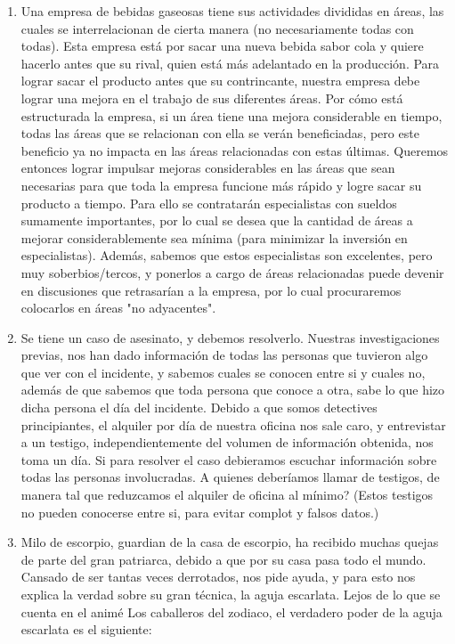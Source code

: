 \documentclass[a4paper]{article}
\begin{document}
\begin{enumerate}
	\item Una empresa de bebidas gaseosas tiene sus actividades divididas en áreas, las cuales se interrelacionan de cierta manera (no necesariamente todas con todas).  Esta empresa está por sacar una nueva bebida sabor cola y quiere hacerlo antes que su rival, quien está más adelantado en la producción.  Para lograr sacar el producto antes que su contrincante, nuestra empresa debe lograr una mejora en el trabajo de sus diferentes áreas.  Por cómo está estructurada la empresa, si un área tiene una mejora considerable en tiempo, todas las áreas que se relacionan con ella se verán beneficiadas, pero este beneficio ya no impacta en las áreas relacionadas con estas últimas.  Queremos entonces lograr impulsar mejoras considerables en las áreas que sean necesarias para que toda la empresa funcione más rápido y logre sacar su producto a tiempo.  Para ello se contratarán especialistas con sueldos sumamente importantes, por lo cual se desea que la cantidad de áreas a mejorar considerablemente sea mínima (para minimizar la inversión en especialistas).  Además, sabemos que estos especialistas son excelentes, pero muy soberbios/tercos, y ponerlos a cargo de áreas relacionadas puede devenir en discusiones que retrasarían a la empresa, por lo cual procuraremos colocarlos en áreas "no adyacentes".
	\item Se tiene un caso de asesinato, y debemos resolverlo. Nuestras investigaciones previas, nos han dado información de todas las personas que tuvieron algo que ver con el incidente, y sabemos cuales se conocen entre si y cuales no, además de que sabemos que toda persona que conoce a otra, sabe lo que hizo dicha persona el día del incidente. Debido a que somos detectives principiantes, el alquiler por día de nuestra oficina nos sale caro, y entrevistar a un testigo, independientemente del volumen de información obtenida, nos toma un día. Si para resolver el caso debieramos escuchar información sobre todas las personas involucradas. A quienes deberíamos llamar de testigos, de manera tal que reduzcamos el alquiler de oficina al mínimo? (Estos testigos no pueden conocerse entre si, para evitar complot y falsos datos.)
	\item Milo de escorpio, guardian de la casa de escorpio, ha recibido muchas quejas de parte del gran patriarca, debido a que por su casa pasa todo el mundo. Cansado de ser tantas veces derrotados, nos pide ayuda, y para esto nos explica la verdad sobre su gran técnica, la aguja escarlata. Lejos de lo que se cuenta en el animé Los caballeros del zodiaco, el verdadero poder de la aguja escarlata es el siguiente:


\end{enumerate}
\end{document}
